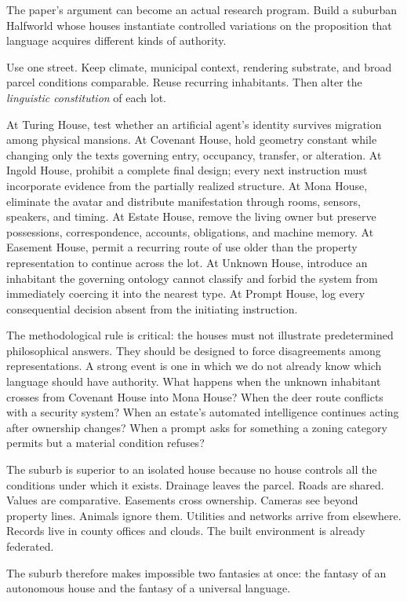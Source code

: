 \documentclass[11pt]{article}
\begin{document}
The paper's argument can become an actual research program. Build a suburban Halfworld whose houses instantiate controlled variations on the proposition that language acquires different kinds of authority.

Use one street. Keep climate, municipal context, rendering substrate, and broad parcel conditions comparable. Reuse recurring inhabitants. Then alter the \emph{linguistic constitution} of each lot.

At Turing House, test whether an artificial agent's identity survives migration among physical mansions. At Covenant House, hold geometry constant while changing only the texts governing entry, occupancy, transfer, or alteration. At Ingold House, prohibit a complete final design; every next instruction must incorporate evidence from the partially realized structure. At Mona House, eliminate the avatar and distribute manifestation through rooms, sensors, speakers, and timing. At Estate House, remove the living owner but preserve possessions, correspondence, accounts, obligations, and machine memory. At Easement House, permit a recurring route of use older than the property representation to continue across the lot. At Unknown House, introduce an inhabitant the governing ontology cannot classify and forbid the system from immediately coercing it into the nearest type. At Prompt House, log every consequential decision absent from the initiating instruction.

The methodological rule is critical: the houses must not illustrate predetermined philosophical answers. They should be designed to force disagreements among representations. A strong event is one in which we do not already know which language should have authority. What happens when the unknown inhabitant crosses from Covenant House into Mona House? When the deer route conflicts with a security system? When an estate's automated intelligence continues acting after ownership changes? When a prompt asks for something a zoning category permits but a material condition refuses?

The suburb is superior to an isolated house because no house controls all the conditions under which it exists. Drainage leaves the parcel. Roads are shared. Values are comparative. Easements cross ownership. Cameras see beyond property lines. Animals ignore them. Utilities and networks arrive from elsewhere. Records live in county offices and clouds. The built environment is already federated.

The suburb therefore makes impossible two fantasies at once: the fantasy of an autonomous house and the fantasy of a universal language.
\end{document}
